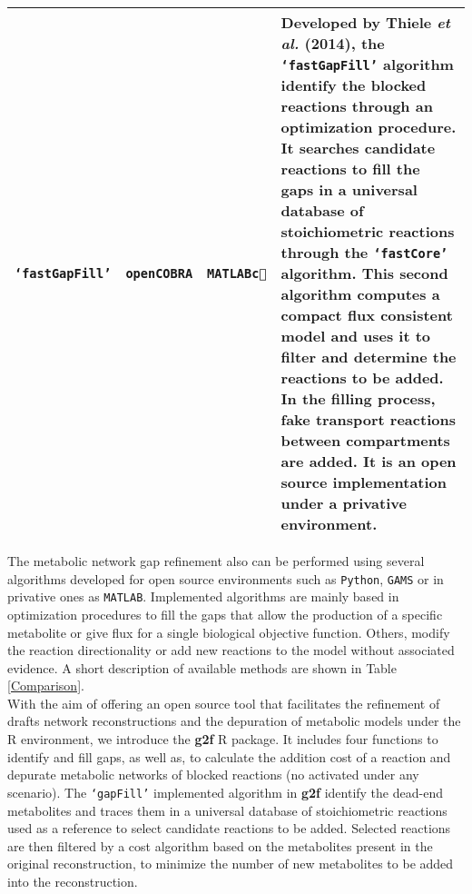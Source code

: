 \begin{center}
\begin{longtable}{|m{3.6cm}|c|c|m{6.7cm}|}
\hline
\texttt{`fastGapFill'} \cite{Thiele2014gf}&\texttt{openCOBRA}&\texttt{MATLAB\textcircled{c}} & {Developed by Thiele \textit{et al.} (2014), the \texttt{`fastGapFill'} algorithm identify the blocked reactions through an optimization procedure. It searches candidate reactions to fill the gaps in a universal database of stoichiometric reactions through the \texttt{`fastCore'} algorithm. This second algorithm computes a compact flux consistent model and uses it to filter and determine the reactions to be added. In the filling process, fake transport reactions between compartments are added. It is an open source implementation under a privative environment.}\\
\hline
\end{longtable}
\end{center}

The metabolic network gap refinement also can be performed using several algorithms developed for open source environments such as \texttt{Python}, \texttt{GAMS} or in privative ones as \texttt{MATLAB}. Implemented algorithms are mainly based in optimization procedures to fill the gaps that allow the production of a specific metabolite or give flux for a single biological objective function. Others, modify the reaction directionality or add new reactions to the model without associated evidence. A short description of available methods are shown in Table \ref{Comparison}.\\

With the aim of offering an open source tool that facilitates the refinement of drafts network reconstructions and the depuration of metabolic models under the R environment, we introduce the \textbf{g2f} R package. It includes four functions to identify and fill gaps, as well as, to calculate the addition cost of a reaction and depurate metabolic networks of blocked reactions (no activated under any scenario). The \texttt{`gapFill'} implemented algorithm in \textbf{g2f} identify the dead-end metabolites and traces them in a universal database of stoichiometric reactions used as a reference to select candidate reactions to be added. Selected reactions are then filtered by a cost algorithm based on the metabolites present in the original reconstruction, to minimize the number of new metabolites to be added into the reconstruction.\\
